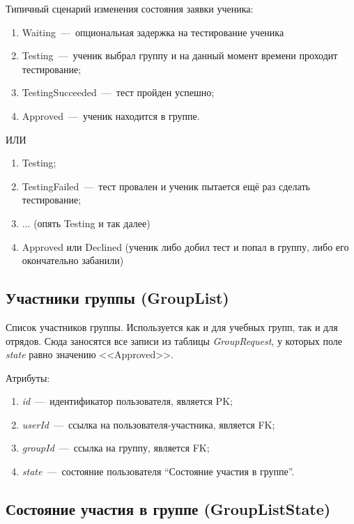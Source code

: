 \documentclass[14pt]{article}
\begin{document}
Типичный сценарий изменения состояния заявки ученика:

\begin{enumerate}
	\item Waiting~---~опциональная задержка на тестирование ученика
	\item Testing~---~ученик выбрал группу и на данный момент времени проходит тестирование;
	\item TestingSucceeded~---~тест пройден успешно;
	\item Approved~---~ученик находится в группе.
\end{enumerate}

ИЛИ

\begin{enumerate}
	\item Testing;
	\item TestingFailed~---~тест провален и ученик пытается ещё раз сделать тестирование;
	\item ... (опять Testing и так далее)
	\item Approved или Declined (ученик либо добил тест и попал в группу, либо его окончательно забанили)
\end{enumerate}

\subsection{Участники группы (GroupList)}

Список участников группы. Используется как и для учебных групп, так и для отрядов. Сюда заносятся все записи из таблицы \emph{GroupRequest}, у которых поле \emph{state} равно значению <<Approved>>.

Атрибуты:
\begin{enumerate}
	\item \emph{id}~---~идентификатор пользователя, является PK; 
	\item \emph{userId}~---~ссылка на пользователя-участника, является FK;
	\item \emph{groupId}~---~ссылка на группу, является FK;
	\item \emph{state}~---~состояние пользователя ``Состояние участия в группе''.
\end{enumerate}

\subsection{Состояние участия в группе (GroupListState)}
\end{document}
